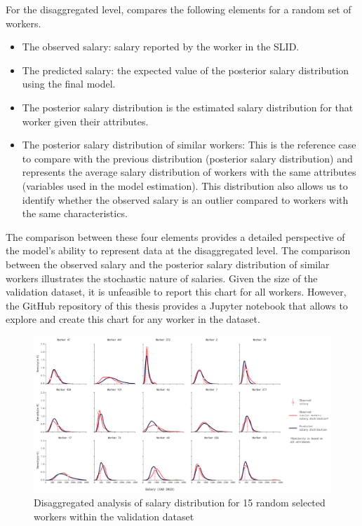 For the disaggregated level,  compares the following elements for a random set of workers. 

\begin{itemize}
    \item The observed salary: salary reported by the worker in the SLID. 

    \item The predicted salary: the expected value of the posterior salary distribution using the final model. 
    
    \item The posterior salary distribution is the estimated salary distribution for that worker given their attributes.
    
    \item The posterior salary distribution of similar workers: This is the reference case to compare with the previous distribution (posterior salary distribution) and represents the average salary distribution of workers with the same attributes (variables used in the model estimation). This distribution also allows us to identify whether the observed salary is an outlier compared to workers with the same characteristics. 
\end{itemize}

The comparison between these four elements provides a detailed perspective of the model's ability to represent data at the disaggregated level. The comparison between the observed salary and the posterior salary distribution of similar workers illustrates the stochastic nature of salaries. Given the size of the validation dataset, it is unfeasible to report this chart for all workers. However, the GitHub repository of this thesis provides a Jupyter notebook that allows to explore and create this chart for any worker in the dataset. 

\begin{landscape}
    \begin{figure}[H]
        \centering
        \includegraphics[width=1.3\textwidth]{images/ch5_disagg_level/workers.png}
        \caption{Disaggregated analysis of salary distribution for 15 random selected workers within the validation dataset}
        \setlength{\abovecaptionskip}{-10pt}
        \label{fig:validation_disagg}
    \end{figure}
\end{landscape}



